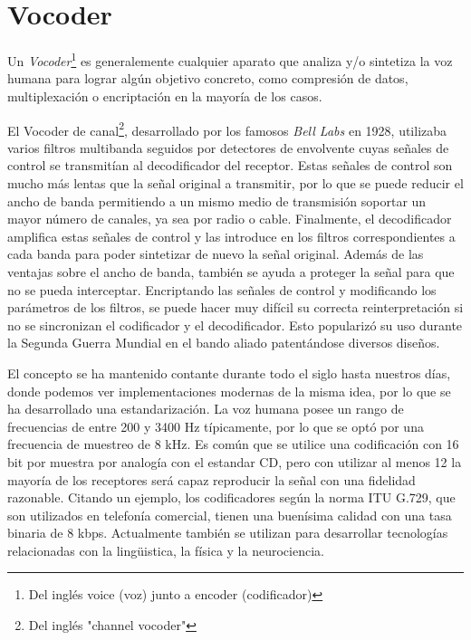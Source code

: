 \section{Vocoder}
Un \emph{Vocoder}\footnote{Del inglés voice (voz) junto a encoder (codificador)} es generalemente cualquier aparato que analiza y/o sintetiza la voz humana para lograr algún objetivo concreto, como compresión de datos, multiplexación o encriptación en la mayoría de los casos.

El Vocoder de canal\footnote{Del inglés "channel vocoder"}, desarrollado por los famosos \emph{Bell Labs} en 1928, utilizaba varios filtros multibanda seguidos por detectores de envolvente cuyas señales de control se transmitían al decodificador del receptor. Estas señales de control son mucho más lentas que la señal original a transmitir, por lo que se puede reducir el ancho de banda permitiendo a un mismo medio de transmisión soportar un mayor número de canales, ya sea por radio o cable. Finalmente, el decodificador amplifica estas señales de control y las introduce en los filtros correspondientes a cada banda para poder sintetizar de nuevo la señal original. Además de las ventajas sobre el ancho de banda, también se ayuda a proteger la señal para que no se pueda interceptar. Encriptando las señales de control y modificando los parámetros de los filtros, se puede hacer muy difícil su correcta reinterpretación si no se sincronizan el codificador y el decodificador. Esto popularizó su uso durante la Segunda Guerra Mundial en el bando aliado patentándose diversos diseños.

El concepto se ha mantenido contante durante todo el siglo hasta nuestros días, donde podemos ver implementaciones modernas de la misma idea, por lo que se ha desarrollado una estandarización. La voz humana posee un rango de frecuencias de entre 200 y 3400 Hz típicamente, por lo que se optó por una frecuencia de muestreo de 8 kHz. Es común que se utilice una codificación con 16 bit por muestra por analogía con el estandar CD, pero con utilizar al menos 12 la mayoría de los receptores será capaz reproducir la señal con una fidelidad razonable. Citando un ejemplo, los codificadores según la norma ITU G.729, que son utilizados en telefonía comercial, tienen una buenísima calidad con una tasa binaria de 8 kbps. Actualmente también se utilizan para desarrollar tecnologías relacionadas con la lingüistica, la física y la neurociencia.

